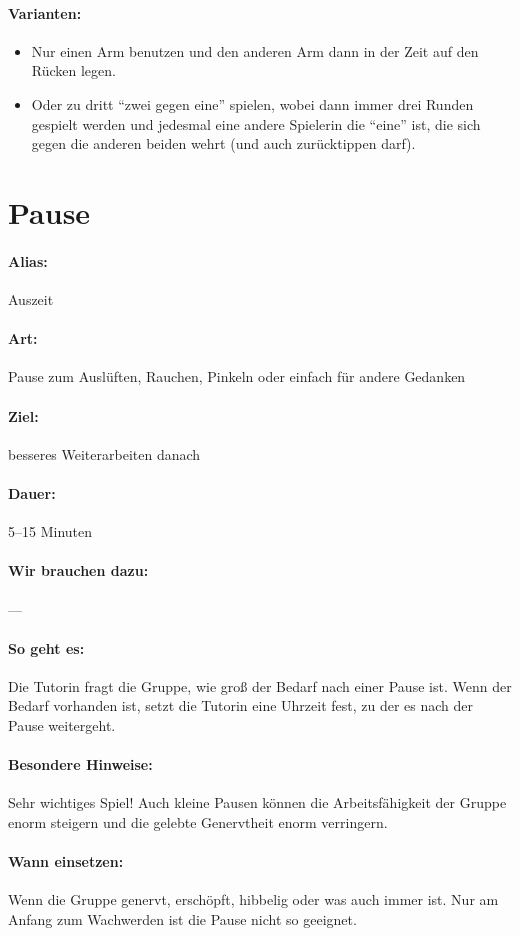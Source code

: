 \paragraph{Varianten:}
\begin{itemize}
  \item Nur einen Arm benutzen und den anderen Arm dann in der Zeit auf den Rücken legen.
  \item Oder zu dritt "`zwei gegen eine"' spielen, wobei dann immer drei Runden gespielt werden und jedesmal eine andere Spielerin die "`eine"' ist, die sich gegen die anderen beiden wehrt (und auch zurücktippen darf).
\end{itemize}

\section{Pause}
\paragraph{Alias:} Auszeit
\paragraph{Art:} Pause zum Auslüften, Rauchen, Pinkeln oder einfach für andere Gedanken
\paragraph{Ziel:} besseres Weiterarbeiten danach
\paragraph{Dauer:} 5--15 Minuten
\paragraph{Wir brauchen dazu:} ---
\paragraph{So geht es:} Die Tutorin fragt die Gruppe, wie groß der Bedarf nach einer Pause ist. Wenn der Bedarf vorhanden ist, setzt die Tutorin eine Uhrzeit fest, zu der es nach der Pause weitergeht.
\paragraph{Besondere Hinweise:} Sehr wichtiges Spiel! Auch kleine Pausen können die Arbeitsfähigkeit der Gruppe enorm steigern und die gelebte Genervtheit enorm verringern.
\paragraph{Wann einsetzen:} Wenn die Gruppe genervt, erschöpft, hibbelig oder was auch immer ist. Nur am Anfang zum Wachwerden ist die Pause nicht so geeignet.

